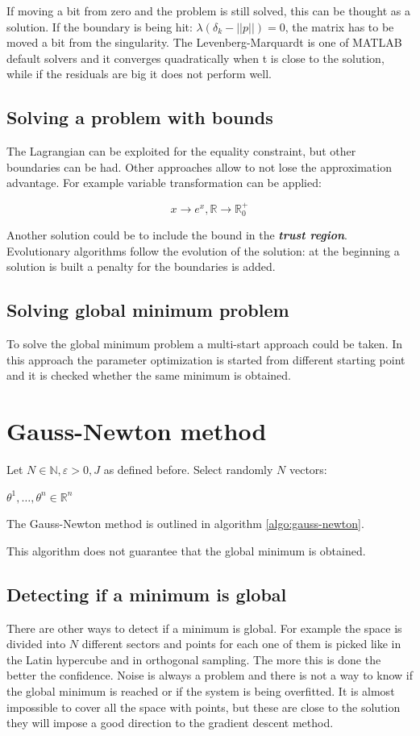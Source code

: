 If moving a bit from zero and the problem is still solved, this can be thought as a solution.
If the boundary is being hit: $\lambda(\delta_k-||p||)=0$, the matrix has to be moved a bit from the singularity.
The Levenberg-Marquardt is one of MATLAB default solvers and it converges quadratically when t is close to the solution, while if the residuals are big it does not perform well.

  \subsection{Solving a problem with bounds}
  The Lagrangian can be exploited for the equality constraint, but other boundaries can be had.
  Other approaches allow to not lose the approximation advantage.
  For example variable transformation can be applied:

  $$x \rightarrow e^x, \mathbb{R} \rightarrow \mathbb{R}_0^+$$

  Another solution could be to include the bound in the \textbf{\emph{trust region}}.
  Evolutionary algorithms follow the evolution of the solution: at the beginning a solution is built a penalty for the boundaries is added.

  \subsection{Solving global minimum problem}
  To solve the global minimum problem a multi-start approach could be taken.
  In this approach the parameter optimization is started from different starting point and it is checked whether the same minimum is obtained.

\section{Gauss-Newton method}
Let $N \in \mathbb{N}, \varepsilon > 0, J$ as defined before.
Select randomly $N$ vectors:

$\theta^1, \dots, \theta^n \in \mathbb{R}^n$

The Gauss-Newton method is outlined in algorithm \ref{algo:gauss-newton}.



This algorithm does not guarantee that the global minimum is obtained.

  \subsection{Detecting if a minimum is global}
  There are other ways to detect if a minimum is global.
  For example the space is divided into $N$ different sectors and points for each one of them is picked like in the Latin hypercube and in orthogonal sampling.
  The more this is done the better the confidence.
  Noise is always a problem and there is not a way to know if the global minimum is reached or if the system is being overfitted.
  It is almost impossible to cover all the space with points, but these are close to the solution they will impose a good direction to the gradient descent method.


